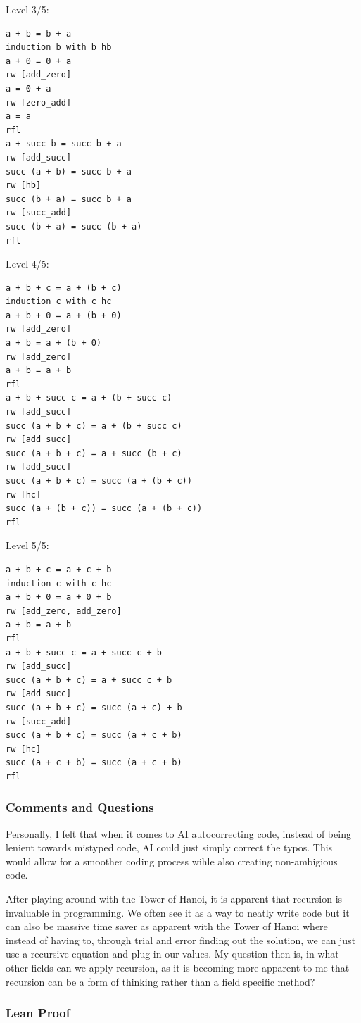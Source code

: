 \documentclass{article}
\theoremstyle{theorem}
\theoremstyle{definition}
\theoremstyle{remark}
\begin{document}
Level 3/5:
\begin{lstlisting}
a + b = b + a
induction b with b hb
a + 0 = 0 + a
rw [add_zero]
a = 0 + a
rw [zero_add]
a = a
rfl
a + succ b = succ b + a
rw [add_succ]
succ (a + b) = succ b + a
rw [hb]
succ (b + a) = succ b + a
rw [succ_add]
succ (b + a) = succ (b + a)
rfl
\end{lstlisting}

Level 4/5:
\begin{lstlisting}
a + b + c = a + (b + c)
induction c with c hc
a + b + 0 = a + (b + 0)
rw [add_zero]
a + b = a + (b + 0)
rw [add_zero]
a + b = a + b
rfl
a + b + succ c = a + (b + succ c)
rw [add_succ]
succ (a + b + c) = a + (b + succ c)
rw [add_succ]
succ (a + b + c) = a + succ (b + c)
rw [add_succ]
succ (a + b + c) = succ (a + (b + c))
rw [hc]
succ (a + (b + c)) = succ (a + (b + c))
rfl
\end{lstlisting}

Level 5/5:
\begin{lstlisting}
a + b + c = a + c + b
induction c with c hc
a + b + 0 = a + 0 + b
rw [add_zero, add_zero]
a + b = a + b
rfl
a + b + succ c = a + succ c + b
rw [add_succ]
succ (a + b + c) = a + succ c + b
rw [add_succ]
succ (a + b + c) = succ (a + c) + b
rw [succ_add]
succ (a + b + c) = succ (a + c + b)
rw [hc]
succ (a + c + b) = succ (a + c + b)
rfl
\end{lstlisting}
\subsubsection*{Comments and Questions}

Personally, I felt that when it comes to AI autocorrecting code, instead of being lenient towards mistyped code, AI could just simply correct the typos. This would allow for a smoother coding process wihle also creating non-ambigious code.

After playing around with the Tower of Hanoi, it is apparent that recursion is invaluable in programming. We often see it as a way to neatly write code but it can also be massive time saver as apparent with the Tower of Hanoi where instead of having to, through trial and error finding out the solution, we can just use a recursive equation and plug in our values. My question then is, in what other fields can we apply recursion, as it is becoming more apparent to me that recursion can be a form of thinking rather than a field specific method?

\subsubsection*{Lean Proof}
\end{document}
